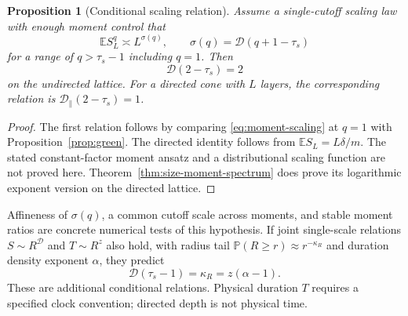 \documentclass[11pt]{article}
\numberwithin{equation}{section}
\newtheorem{proposition}[theorem]{Proposition}
\theoremstyle{definition}
\newcommand{\E}{\mathbb E}
\newcommand{\Prob}{\mathbb P}
\begin{document}
\begin{proposition}[Conditional scaling relation]\label{prop:conditional-scaling}
Assume a single-cutoff scaling law with enough moment control that
\begin{equation}\label{eq:moment-scaling}
 \E S_L^q\asymp L^{\sigma(q)},\qquad
 \sigma(q)=\mathcal D(q+1-\tau_s)
\end{equation}
for a range of $q>\tau_s-1$ including $q=1$. Then
\begin{equation}\label{eq:conservation-scaling}
 \mathcal D(2-\tau_s)=2
\end{equation}
on the undirected lattice. For a directed cone with $L$ layers, the corresponding relation is
$\mathcal D_\parallel(2-\tau_s)=1$.
\end{proposition}
\begin{proof}
The first relation follows by comparing \eqref{eq:moment-scaling} at $q=1$ with Proposition~\ref{prop:green}. The directed identity follows from $\E S_L=L\delta/m$. The stated constant-factor moment ansatz and a distributional scaling function are not proved here. Theorem~\ref{thm:size-moment-spectrum} does prove its logarithmic exponent version on the directed lattice.
\end{proof}
Affineness of $\sigma(q)$, a common cutoff scale across moments, and stable moment ratios are concrete numerical tests of this hypothesis. If joint single-scale relations $S\sim R^{\mathcal D}$ and $T\sim R^z$ also hold, with radius tail $\Prob(R\ge r)\approx r^{-\kappa_R}$ and duration density exponent $\alpha$, they predict
\[
 \mathcal D(\tau_s-1)=\kappa_R=z(\alpha-1).
\]
These are additional conditional relations. Physical duration $T$ requires a specified clock convention; directed depth is not physical time.
\end{document}
